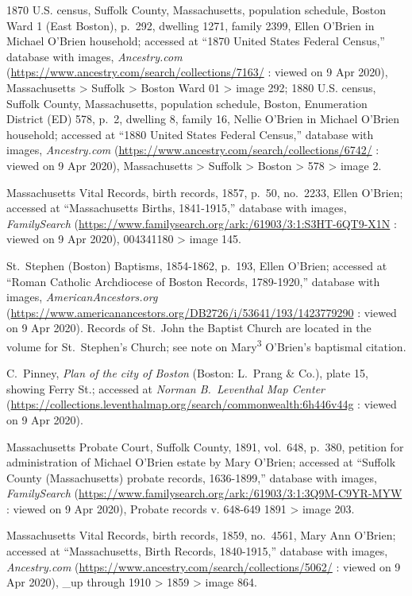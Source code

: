 \begin{thebibliography}{999}
1870 U.S. census, Suffolk County, Massachusetts, population schedule, Boston Ward 1 (East Boston), p.\ 292, dwelling 1271, family 2399, Ellen O'Brien in Michael O'Brien household; accessed at ``1870 United States Federal Census,'' database with images, \textit{Ancestry.com} (\url{https://www.ancestry.com/search/collections/7163/} : viewed on 9 Apr 2020), Massachusetts > Suffolk > Boston Ward 01 > image 292; 1880 U.S. census, Suffolk County, Massachusetts, population schedule, Boston, Enumeration District (ED) 578, p.\ 2, dwelling 8, family 16, Nellie O'Brien in Michael O'Brien household; accessed at ``1880 United States Federal Census,'' database with images, \textit{Ancestry.com} (\url{https://www.ancestry.com/search/collections/6742/} : viewed on 9 Apr 2020), Massachusetts > Suffolk > Boston > 578 > image 2.

Massachusetts Vital Records, birth records, 1857, p.\ 50, no.\ 2233, Ellen O'Brien; accessed at ``Massachusetts Births, 1841-1915,'' database with images, \textit{FamilySearch} (\url{https://www.familysearch.org/ark:/61903/3:1:S3HT-6QT9-X1N} : viewed on 9 Apr 2020), 004341180 > image 145.

St.\ Stephen (Boston) Baptisms, 1854-1862, p.\ 193, Ellen O'Brien; accessed at ``Roman Catholic Archdiocese of Boston Records, 1789-1920,'' database with images, \textit{AmericanAncestors.org} (\url{https://www.americanancestors.org/DB2726/i/53641/193/1423779290} : viewed on 9 Apr 2020). Records of St.\ John the Baptist Church are located in the volume for St.\ Stephen's Church; see note on Mary\textsuperscript{3} O'Brien's baptismal citation.

C.\ Pinney, \textit{Plan of the city of Boston} (Boston: L.\ Prang \& Co.), plate 15, showing Ferry St.; accessed at \textit{Norman B.\ Leventhal Map Center} (\url{https://collections.leventhalmap.org/search/commonwealth:6h446v44g} : viewed on 9 Apr 2020).	

Massachusetts Probate Court, Suffolk County, 1891, vol.\ 648, p.\ 380, petition for administration of Michael O'Brien estate by Mary O'Brien; accessed at ``Suffolk County (Massachusetts) probate records, 1636-1899,'' database with images, \textit{FamilySearch} (\url{https://www.familysearch.org/ark:/61903/3:1:3Q9M-C9YR-MYW} : viewed on 9 Apr 2020), Probate records v. 648-649 1891 > image 203.

Massachusetts Vital Records, birth records, 1859, no.\ 4561, Mary Ann O'Brien; accessed at ``Massachusetts, Birth Records, 1840-1915,'' database with images, \textit{Ancestry.com} (\url{https://www.ancestry.com/search/collections/5062/} : viewed on 9 Apr 2020), \_up through 1910 > 1859 > image 864.


\end{thebibliography}
